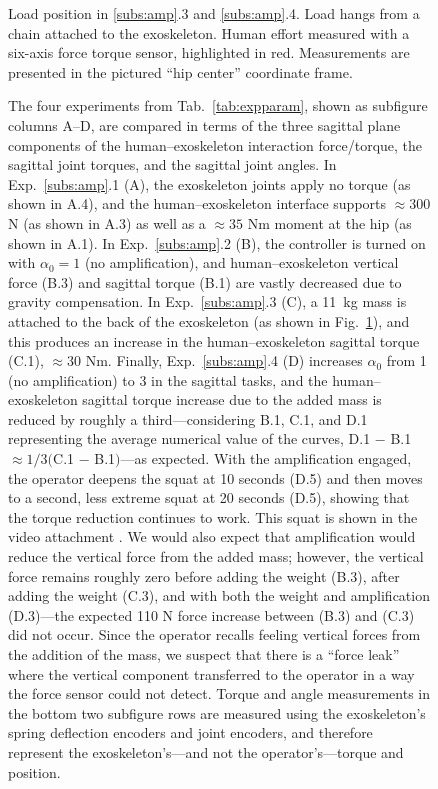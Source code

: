 \documentclass[utf8]{frontiersSCNS}
\renewcommand*{\cite}[1]{\citep{#1}}
\begin{document}
\begin{figure}[t]
\centering
		\def\svgwidth{1.6in}
		

	\caption{Load position in \ref{subs:amp}.3 and \ref{subs:amp}.4. Load hangs from a chain attached to the exoskeleton. Human effort measured with a six-axis force torque sensor, highlighted in red. Measurements are presented in the pictured ``hip center'' coordinate frame.}\label{fig:experimental_condition}
\end{figure}

\begin{figure}[!tp]%
	\centering\resizebox{1\textwidth}{!}{\def\svgwidth{\textwidth}\footnotesize%
	}%
	\caption{The four experiments from Tab.~\ref{tab:expparam}, shown as subfigure columns A--D, are compared in terms of the three sagittal plane components of the human--exoskeleton interaction force/torque, the sagittal joint torques, and the sagittal joint angles. In Exp.~\ref{subs:amp}.1 (A), the exoskeleton joints apply no torque (as shown in A.4), and the human--exoskeleton interface supports $\approx300$ N (as shown in A.3) as well as a $\approx35$ Nm moment at the hip (as shown in A.1). In Exp.~\ref{subs:amp}.2 (B), the controller is turned on with $\alpha_0=1$ (no amplification), and human--exoskeleton vertical force (B.3) and sagittal torque (B.1) are vastly decreased due to gravity compensation. In Exp.~\ref{subs:amp}.3 (C), a 11~kg mass is attached to the back of the exoskeleton (as shown in Fig.~\ref{fig:experimental_condition}), and this produces an increase in the human--exoskeleton sagittal torque (C.1), $\approx30$ Nm. Finally, Exp.~\ref{subs:amp}.4 (D) increases $\alpha_0$ from 1 (no amplification) to 3 in the sagittal tasks, and the human--exoskeleton sagittal torque increase due to the added mass is reduced by roughly a third---considering B.1, C.1, and D.1 representing the average numerical value of the curves, D.1 $-$ B.1 $\approx 1/3($C.1 $-$ B.1$)$---as expected. With the amplification engaged, the operator deepens the squat at 10 seconds (D.5) and then moves to a second, less extreme squat at 20 seconds (D.5), showing that the torque reduction continues to work. This squat is shown in the video attachment  \cite{Thomas2020Youtube}. We would also expect that amplification would reduce the vertical force from the added mass; however, the vertical force remains roughly zero before adding the weight (B.3), after adding the weight (C.3), and with both the weight and amplification (D.3)---the expected 110 N force increase between (B.3) and (C.3) did not occur. Since the operator recalls feeling vertical forces from the addition of the mass, we suspect that there is a ``force leak'' where the vertical component transferred to the operator in a way the force sensor could not detect. Torque and angle measurements in the bottom two subfigure rows are measured using the exoskeleton's spring deflection encoders and joint encoders, and therefore represent the exoskeleton's---and not the operator's---torque and position.
	}\label{fig:experiment}
\end{figure}
\end{document}
